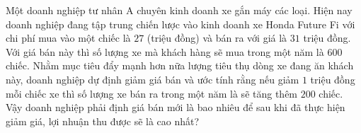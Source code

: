 \begin{ex}%
	Một doanh nghiệp tư nhân A chuyên kinh doanh xe gắn máy các loại. Hiện nay doanh nghiệp đang tập trung chiến lược vào kinh doanh xe Honda Future Fi với chi phí mua vào một chiếc là $27$ (triệu đồng) và bán ra với giá là $31$ triệu đồng. Với giá bán này thì số lượng xe mà khách hàng sẽ mua trong một năm là $600$ chiếc. Nhằm mục tiêu đẩy mạnh hơn nữa lượng tiêu thụ dòng xe đang ăn khách này, doanh nghiệp dự định giảm giá bán và ước tính rằng nếu giảm $1$ triệu đồng mỗi chiếc xe thì số lượng xe bán ra trong một năm là sẽ tăng thêm $200$ chiếc. Vậy doanh nghiệp phải định giá bán mới là bao nhiêu để sau khi đã thực hiện giảm giá, lợi nhuận thu được sẽ là cao nhất?
\end{ex}
